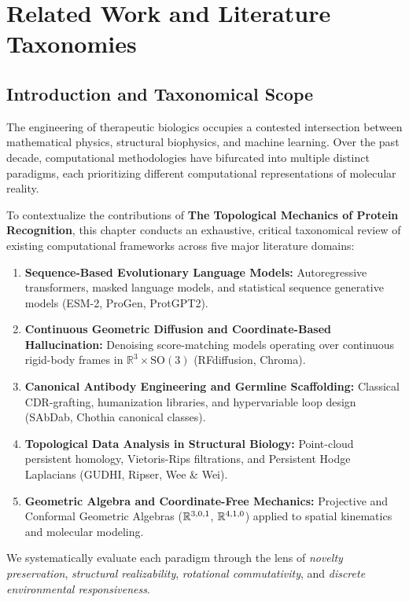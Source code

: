 \chapter{Related Work and Literature Taxonomies}
\label{ch:related_work}

\section{Introduction and Taxonomical Scope}
\label{sec:related_work_intro}

The engineering of therapeutic biologics occupies a contested intersection between mathematical physics, structural biophysics, and machine learning. Over the past decade, computational methodologies have bifurcated into multiple distinct paradigms, each prioritizing different computational representations of molecular reality. 

To contextualize the contributions of \textbf{The Topological Mechanics of Protein Recognition}, this chapter conducts an exhaustive, critical taxonomical review of existing computational frameworks across five major literature domains:
\begin{enumerate}[leftmargin=1.5cm]
    \item \textbf{Sequence-Based Evolutionary Language Models:} Autoregressive transformers, masked language models, and statistical sequence generative models (ESM-2, ProGen, ProtGPT2).
    \item \textbf{Continuous Geometric Diffusion and Coordinate-Based Hallucination:} Denoising score-matching models operating over continuous rigid-body frames in $\mathbb{R}^3 \times \mathrm{SO}(3)$ (RFdiffusion, Chroma).
    \item \textbf{Canonical Antibody Engineering and Germline Scaffolding:} Classical CDR-grafting, humanization libraries, and hypervariable loop design (SAbDab, Chothia canonical classes).
    \item \textbf{Topological Data Analysis in Structural Biology:} Point-cloud persistent homology, Vietoris-Rips filtrations, and Persistent Hodge Laplacians (GUDHI, Ripser, Wee \& Wei).
    \item \textbf{Geometric Algebra and Coordinate-Free Mechanics:} Projective and Conformal Geometric Algebras ($\mathbb{R}^{3,0,1}$, $\mathbb{R}^{4,1,0}$) applied to spatial kinematics and molecular modeling.
\end{enumerate}

We systematically evaluate each paradigm through the lens of \textit{novelty preservation}, \textit{structural realizability}, \textit{rotational commutativity}, and \textit{discrete environmental responsiveness}.

